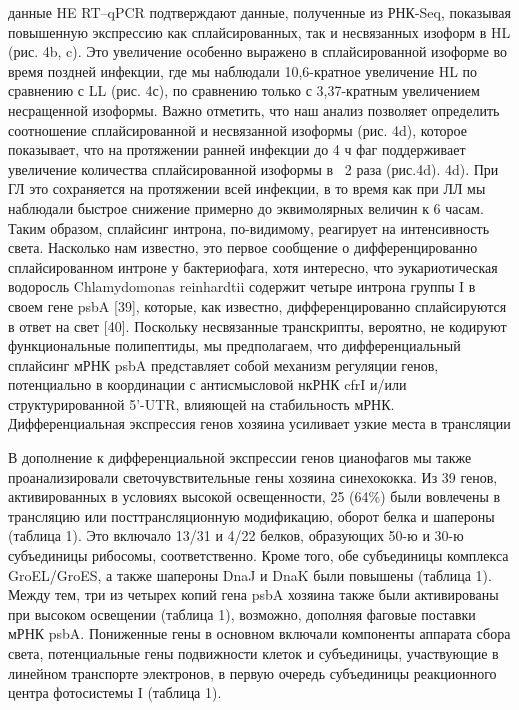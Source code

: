 \documentclass[a4paper,12pt]{article}
\begin{document}
            \par{данные HE RT–qPCR подтверждают данные, полученные из РНК-Seq, показывая повышенную экспрессию как
            сплайсированных, так и несвязанных изоформ в HL (рис. 4b, c). Это увеличение особенно выражено в
            сплайсированной изоформе во время поздней инфекции, где мы наблюдали 10,6-кратное увеличение HL по
            сравнению с LL (рис. 4с), по сравнению только с 3,37-кратным увеличением несращенной изоформы. Важно
            отметить, что наш анализ позволяет определить соотношение сплайсированной и несвязанной изоформы (рис. 4d),
            которое показывает, что на протяжении ранней инфекции до 4 ч фаг поддерживает увеличение количества
            сплайсированной изоформы в ~2 раза (рис.4d). 4d). При ГЛ это сохраняется на протяжении всей инфекции, в то
            время как при ЛЛ мы наблюдали быстрое снижение примерно до эквимолярных величин к 6 часам. Таким образом,
            сплайсинг интрона, по-видимому, реагирует на интенсивность света. Насколько нам известно, это первое
            сообщение о дифференцированно сплайсированном интроне у бактериофага, хотя интересно, что эукариотическая
            водоросль Chlamydomonas reinhardtii содержит четыре интрона группы I в своем гене psbA [39], которые, как
            известно, дифференцированно сплайсируются в ответ на свет [40]. Поскольку несвязанные транскрипты,
            вероятно, не кодируют функциональные полипептиды, мы предполагаем, что дифференциальный сплайсинг мРНК psbA
            представляет собой механизм регуляции генов, потенциально в координации с антисмысловой нкРНК cfrI и/или
            структурированной 5'-UTR, влияющей на стабильность мРНК.}\\
            {\Large Дифференциальная экспрессия генов хозяина усиливает узкие места в трансляции}
            \par{В дополнение к дифференциальной экспрессии генов цианофагов мы также проанализировали светочувствительные гены хозяина синехококка. Из 39 генов, активированных в условиях высокой освещенности, 25 (64\%) были вовлечены в трансляцию или посттрансляционную модификацию, оборот белка и шапероны (таблица 1). Это включало 13/31 и 4/22 белков, образующих 50-ю и 30-ю субъединицы рибосомы, соответственно. Кроме того, обе субъединицы комплекса GroEL/GroES, а также шапероны DnaJ и DnaK были повышены (таблица 1). Между тем, три из четырех копий гена psbA хозяина также были активированы при высоком освещении (таблица 1), возможно, дополняя фаговые поставки мРНК psbA. Пониженные гены в основном включали компоненты аппарата сбора света, потенциальные гены подвижности клеток и субъединицы, участвующие в линейном транспорте электронов, в первую очередь субъединицы реакционного центра фотосистемы I (таблица 1).}
\newpage
\end{document}
